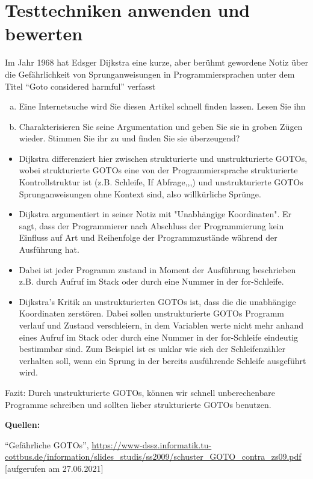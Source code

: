 \section{Testtechniken anwenden und bewerten}
Im Jahr 1968 hat Edsger Dijkstra eine kurze, aber berühmt gewordene Notiz über die Gefährlichkeit von Sprunganweisungen in Programmiersprachen unter dem Titel “Goto considered
harmful” verfasst
\begin{enumerate}[a)]
    \item Eine Internetsuche wird Sie diesen Artikel schnell finden lassen. Lesen Sie ihn
    \item Charakterisieren Sie seine Argumentation und geben Sie sie in groben Zügen wieder.
Stimmen Sie ihr zu und finden Sie sie überzeugend?
\end{enumerate}
\begin{itemize}
    \item Dijkstra differenziert hier zwischen strukturierte und unstrukturierte GOTOs, wobei strukturierte GOTOs eine von der Programmiersprache strukturierte Kontrollstruktur ist (z.B. Schleife, If Abfrage,,,) und unstrukturierte GOTOs Sprunganweisungen ohne Kontext sind, also willkürliche Sprünge.
    \item Dijkstra argumentiert in seiner Notiz mit "Unabhängige Koordinaten". Er sagt, dass der Programmierer nach Abschluss der Programmierung kein Einfluss auf Art und Reihenfolge der Programmzustände während der Ausführung hat.
    \item Dabei ist jeder Programm zustand in Moment der Ausführung beschrieben z.B. durch Aufruf im Stack oder durch eine Nummer in der for-Schleife.
    \item Dijkstra's Kritik an unstrukturierten GOTOs ist, dass die die unabhängige Koordinaten zerstören. Dabei sollen unstrukturierte GOTOs Programm verlauf und Zustand verschleiern, in dem Variablen werte nicht mehr anhand eines Aufruf im Stack oder durch eine Nummer in der for-Schleife eindeutig bestimmbar sind. Zum Beispiel ist es unklar wie sich der Schleifenzähler verhalten soll, wenn ein Sprung in der bereits ausführende Schleife ausgeführt wird.
\end{itemize}
Fazit: Durch unstrukturierte GOTOs, können wir schnell unberechenbare Programme schreiben und sollten lieber strukturierte GOTOs benutzen.

\textbf{Quellen:}
\begin{enumerate}[{[1]}]
    \item  ``Gefährliche GOTOs'', \url{https://www-dssz.informatik.tu-cottbus.de/information/slides_studis/ss2009/schuster_GOTO_contra_zs09.pdf} [aufgerufen am 27.06.2021]
\end{enumerate}


